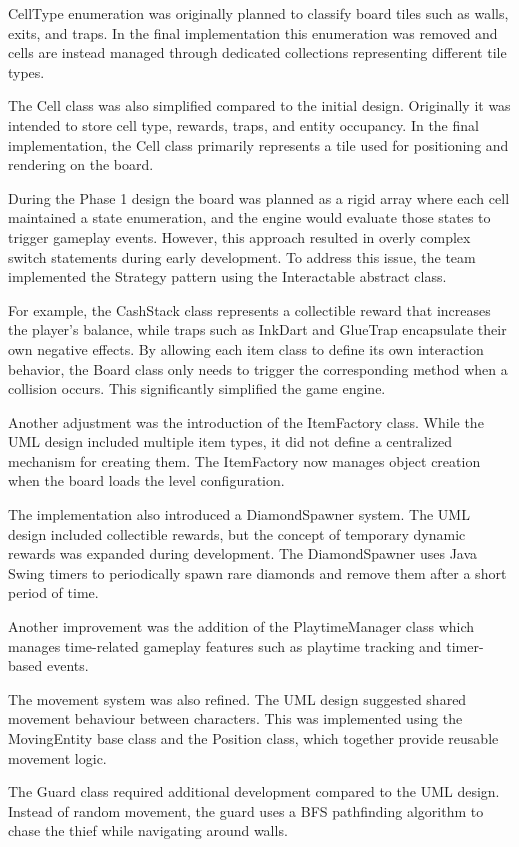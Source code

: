 \documentclass[12pt]{article}
\begin{document}
CellType enumeration was originally planned to classify board tiles such as walls, exits, and traps. In the final implementation this enumeration was removed and cells are instead managed through dedicated collections representing different tile types.

The Cell class was also simplified compared to the initial design. Originally it was intended to store cell type, rewards, traps, and entity occupancy. In the final implementation, the Cell class primarily represents a tile used for positioning and rendering on the board.

During the Phase 1 design the board was planned as a rigid array where each cell maintained a state enumeration, and the engine would evaluate those states to trigger gameplay events. However, this approach resulted in overly complex switch statements during early development. To address this issue, the team implemented the Strategy pattern using the Interactable abstract class.

For example, the CashStack class represents a collectible reward that increases the player's balance, while traps such as InkDart and GlueTrap encapsulate their own negative effects. By allowing each item class to define its own interaction behavior, the Board class only needs to trigger the corresponding method when a collision occurs. This significantly simplified the game engine.

Another adjustment was the introduction of the ItemFactory class. While the UML design included multiple item types, it did not define a centralized mechanism for creating them. The ItemFactory now manages object creation when the board loads the level configuration.

The implementation also introduced a DiamondSpawner system. The UML design included collectible rewards, but the concept of temporary dynamic rewards was expanded during development. The DiamondSpawner uses Java Swing timers to periodically spawn rare diamonds and remove them after a short period of time.

Another improvement was the addition of the PlaytimeManager class which manages time-related gameplay features such as playtime tracking and timer-based events.

The movement system was also refined. The UML design suggested shared movement behaviour between characters. This was implemented using the MovingEntity base class and the Position class, which together provide reusable movement logic.

The Guard class required additional development compared to the UML design. Instead of random movement, the guard uses a BFS pathfinding algorithm to chase the thief while navigating around walls.
\end{document}
